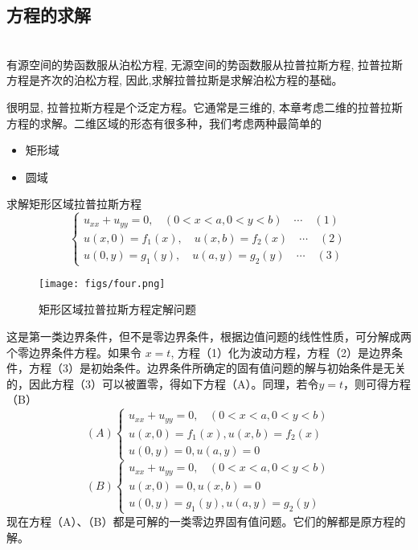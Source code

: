 \subsection{方程的求解} ~\\

有源空间的势函数服从泊松方程, 无源空间的势函数服从拉普拉斯方程, 拉普拉斯方程是齐次的泊松方程, 因此,求解拉普拉斯是求解泊松方程的基础。 

很明显, 拉普拉斯方程是个泛定方程。它通常是三维的, 本章考虑二维的拉普拉斯方程的求解。二维区域的形态有很多种，我们考虑两种最简单的
\begin{itemize}
	\item 矩形域
	\item 圆域
\end{itemize}

\begin{example}
	求解矩形区域拉普拉斯方程
	\begin{equation}\label{eq:laplace6}
	\displaystyle \begin{cases}
		u_{xx} +u_{yy} =0 ,~~~~ (0<x<a, 0<y<b)  \quad \cdots \quad  (1)\\
		u(x,0)= f_1 (x) , \quad u(x,b)= f_2 (x) \quad \cdots \quad (2)\\
		u(0,y)= g_1 (y) , \quad u(a,y)= g_2 (y) \quad \cdots \quad (3)
	\end{cases}
   \end{equation}
   \begin{figure}[h]
	\centering
	\texttt{[image: figs/four.png]}
	\caption{矩形区域拉普拉斯方程定解问题}
	\label{fig:four}
    \end{figure}
\end{example}
	这是第一类边界条件，但不是零边界条件，根据边值问题的线性性质，可分解成两个零边界条件方程。如果令 $x=t$, 方程（1）化为波动方程，方程（2）是边界条件，方程（3）是初始条件。边界条件所确定的固有值问题的解与初始条件是无关的，因此方程（3）可以被置零，得如下方程（A）。同理，若令$y=t$，则可得方程（B）
	$$\displaystyle (A) \begin{cases} 
		u_{xx} +u_{yy} =0 ,~~~~ (0<x<a, 0<y<b) \\
		u(x,0)= f_1 (x) ,  u(x,b)= f_2 (x) \\
		u(0,y)= 0,  u(a,y)= 0 
	\end{cases}$$ 
	$$\displaystyle (B) \begin{cases}
		u_{xx} +u_{yy} =0 ,~~~~ (0<x<a, 0<y<b)\\
		u(x,0)= 0,  u(x,b)= 0 \\
		u(0,y)= g_1 (y) ,  u(a,y)= g_2 (y)
	\end{cases}$$ 
现在方程（A）、（B）都是可解的一类零边界固有值问题。它们的解都是原方程的解。

